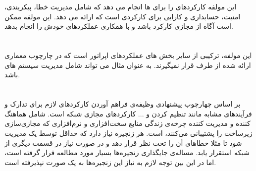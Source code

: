 \section{}
این مولفه کارکردهای  را برای  ها انجام می دهد که شامل مدیریت خطا، پیکربندی، امنیت، حسابداری و کارایی برای کارکردی است که  ارائه می دهد. این مولفه ممکن است آگاه از مجازی کارکرد باشد و با همکاری  عملکردهای خودش را انجام بدهد.

\section{}
این مولفه، ترکیبی از سایر بخش های عملکردهای اپراتور است که در چارچوب معماری  ارائه شده از طرف  قرار نمیگیرند. به عنوان مثال می تواند شامل مدیریت سیستم های  باشد.

\section{}
بر اساس چهارچوب پیشنهادی 
وظیفه‌ی  فراهم آوردن کارکردهای لازم
برای تدارک و فرآیند‌های مشابه مانند تنظیم کردن و ... کارکردهای مجازی شبکه است.
 شامل هماهنگ کننده و مدیریت کننده چرخه‌ی زندگی
منابع سخت‌افزاری و نرم‌افزاری که مجازی‌سازی زیرساخت را پشتیبانی می‌کنند، است.
هر زنجیره نیاز دارد که حداقل توسط یک  مدیریت شود
تا مثلا خطاهای آن را تحت نظر قرار دهد و در صورت نیاز در قسمت دیگری از شبکه استقرار یابد.
مساله‌ی جایگذاری زنجیره‌ها بسیار مورد مطالعه قرار گرفته است، اما در این بین توجه لازم به نیاز این زنجیره‌ها به یک
صورت نپذیرفته است.
